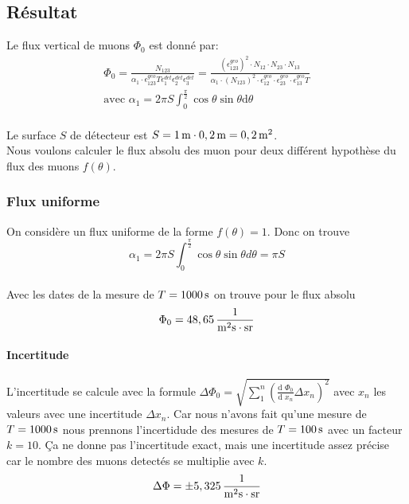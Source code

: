 \documentclass[a4paper,11pt,liststotocnumbered,bibtotocnumbered]{scrartcl}
\begin{document}
  \subsection{Résultat}
   Le flux vertical de muons $\Phi_0$ est donné par:
   \begin{eqnarray*}
    \Phi_0=\frac{N_{123}}{\alpha_1\cdot \epsilon_{123}^{geo}T\epsilon_{1}^{det}\epsilon_{2}^{det}\epsilon_{3}^{det}}=\frac{\left(\epsilon_{123}^{geo}\right)^2 \cdot N_{12}\cdot N_{23}\cdot N_{13}}{\alpha_1 \cdot \left(N_{123}\right)^2 \cdot \epsilon_{12}^{geo}\cdot \epsilon_{23}^{geo}\cdot \epsilon_{13}^{geo}T}\\
    \text{avec }\alpha_1=2\pi S\int_0^{\frac{\pi}{2}}\cos\theta \sin\theta\text{d} \theta
   \end{eqnarray*}\\
   Le surface $S$ de détecteur est $S=\unit[1]{m}\cdot\unit[0,2]{m}=\unit[0,2]{m^2}$.\\
   Nous voulons calculer le flux absolu des muon pour deux différent hypothèse du flux des muons $f(\theta)$.
  
   \subsubsection{Flux uniforme}
    On considère un flux uniforme de la forme $f(\theta)=1$. Donc on trouve
    \begin{equation*}
     \alpha_1=2\pi S\int_0^{\frac{\pi}{2}}\cos\theta \sin\theta d \theta=\pi S
    \end{equation*}\\
    Avec les dates de la mesure de $T=\unit[1000]{s}$ on trouve pour le flux absolu
    \begin{equation*}
     \Phi_0=\unit[48,65]{\frac{1}{m^2s\cdot sr}}
    \end{equation*}
    \paragraph{Incertitude}
    L'incertitude se calcule avec la formule $\Delta\Phi_0=\sqrt{\sum_1^n \left(\frac{\text{d }\Phi_0}{\text{d }x_n}\Delta x_n\right)^2}$ avec $x_n$ les valeurs avec une incertitude $\Delta x_n$. Car nous n'avons fait qu'une mesure de $T=\unit[1000]{s}$ nous prennons l'incertidude des mesures de $T=\unit[100]{s}$ avec un facteur $k=10$. \c Ca ne donne pas l'incertitude exact, mais une incertitude assez précise car le nombre des muons detectés se multiplie avec $k$.
    \begin{equation*}
     \Delta\Phi=\pm \unit[5,325]{\frac{1}{m^2s\cdot sr}}
    \end{equation*}
\end{document}
